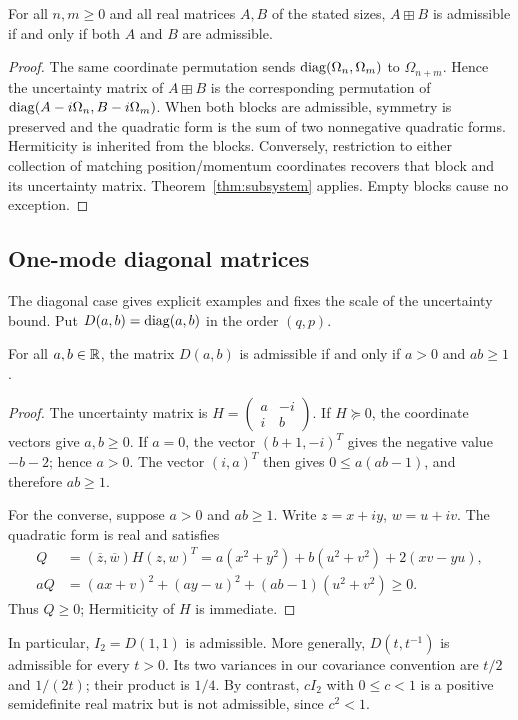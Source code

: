 \begin{theorem}\label{thm:sum}
For all $n,m\geq0$ and all real matrices $A,B$ of the stated sizes,
$A\boxplus B$ is admissible if and only if both $A$ and $B$ are admissible.
\end{theorem}
\begin{proof}
The same coordinate permutation sends $\operatorname{diag}(\Omega_n,\Omega_m)$ to
$\Omega_{n+m}$. Hence the uncertainty matrix of $A\boxplus B$ is the
corresponding permutation of $\operatorname{diag}(A-i\Omega_n,B-i\Omega_m)$.
When both blocks are admissible, symmetry is preserved and the quadratic
form is the sum of two nonnegative quadratic forms. Hermiticity is inherited
from the blocks. Conversely, restriction to either collection of matching
position/momentum coordinates recovers that block and its uncertainty matrix.
Theorem~\ref{thm:subsystem} applies. Empty blocks cause no exception.
\end{proof}

\subsection{One-mode diagonal matrices}
The diagonal case gives explicit examples and fixes the scale of the uncertainty
bound. Put $D(a,b)=\operatorname{diag}(a,b)$ in the order $(q,p)$.
\begin{proposition}\label{prop:diagonal}
For all $a,b\in\mathbb R$, the matrix $D(a,b)$ is admissible if and only if
$a>0$ and $ab\geq1$.
\end{proposition}
\begin{proof}
The uncertainty matrix is
$H=\left(\begin{smallmatrix}a&-i\\i&b\end{smallmatrix}\right)$.
If $H\succeq0$, the coordinate vectors give $a,b\geq0$. If $a=0$,
the vector $(b+1,-i)^T$ gives the negative value $-b-2$; hence $a>0$.
The vector $(i,a)^T$ then gives $0\leq a(ab-1)$, and therefore $ab\geq1$.

For the converse, suppose $a>0$ and $ab\geq1$. Write $z=x+iy$, $w=u+iv$.
The quadratic form is real and satisfies
\begin{align*}
 Q&=(\overline z,\overline w)H(z,w)^T
   =a(x^2+y^2)+b(u^2+v^2)+2(xv-yu),\\
 aQ&=(ax+v)^2+(ay-u)^2+(ab-1)(u^2+v^2)\geq0.
\end{align*}
Thus $Q\geq0$; Hermiticity of $H$ is immediate.
\end{proof}

In particular, $I_2=D(1,1)$ is admissible. More generally,
$D(t,t^{-1})$ is admissible for every $t>0$. Its two variances in our covariance
convention are $t/2$ and $1/(2t)$; their product is $1/4$.
By contrast, $cI_2$ with $0\leq c<1$ is a positive semidefinite real matrix
but is not admissible, since $c^2<1$.

